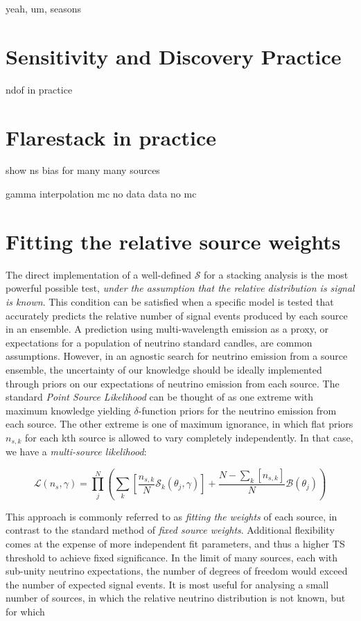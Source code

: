 yeah, um, seasons

\section{Sensitivity and Discovery Practice}

ndof in practice

\section{Flarestack in practice}

show ns  bias for many many sources

gamma interpolation
mc no data
data no mc

\section{Fitting the relative source weights}

The direct implementation of a well-defined $\mathcal{S}$ for a stacking analysis is the most powerful possible test, \emph{under the assumption that the relative distribution is signal is known}. This condition can be satisfied when a specific model is tested that accurately predicts the relative number of signal events produced by each source in an ensemble. A prediction using multi-wavelength emission as a proxy, or expectations for a population of neutrino standard candles, are common assumptions. However, in an agnostic search for neutrino emission from a source ensemble, the uncertainty of our knowledge should be ideally implemented through priors on our expectations of neutrino emission from each source. The standard \emph{Point Source Likelihood} can be thought of as one extreme with maximum knowledge yielding $\delta$-function priors for the neutrino emission from each source. The other extreme is one of maximum ignorance, in which flat priors $n_{s, k}$ for each kth source is allowed to vary completely independently. In that case, we have a \emph{multi-source likelihood}:

\[ \mathcal{L}(n_{s}, \gamma) = \prod_{j}^{N} \left(\sum_{k} \left[ \frac{n_{s, k}}{N} \mathcal{S}_{k}(\theta_{j}, \gamma) \right]+ \frac{N - \sum_{k} \left[ n_{s, k} \right] }{N} \mathcal{B}(\theta_{j})  \right)\]

This approach is commonly referred to as \emph{fitting the weights} of each source, in contrast to the standard method of \emph{fixed source weights}. Additional flexibility comes at the expense of more independent fit parameters, and thus a higher TS threshold to achieve fixed significance. In the limit of many sources, each with sub-unity neutrino expectations, the number of degrees of freedom would exceed the number of expected signal events. It is most useful for analysing a small number of sources, in which the relative neutrino distribution is not known, but for which 

